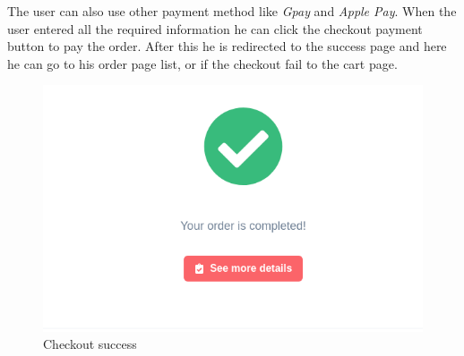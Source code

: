 The user can also use other payment method like \textit{Gpay} and \textit{Apple Pay}.
When the user entered all the required information he can click the checkout payment button to pay the order. After this he is redirected to the success page and here he can go to his order page list, or if the checkout fail to the cart page.
\begin{figure}[!ht]
    \caption{Checkout success}
    \vspace{10px}
    \includegraphics[scale=0.5]{../../../../Images/userManual/checkoutSuccess.png}
    \centering
\end{figure}
